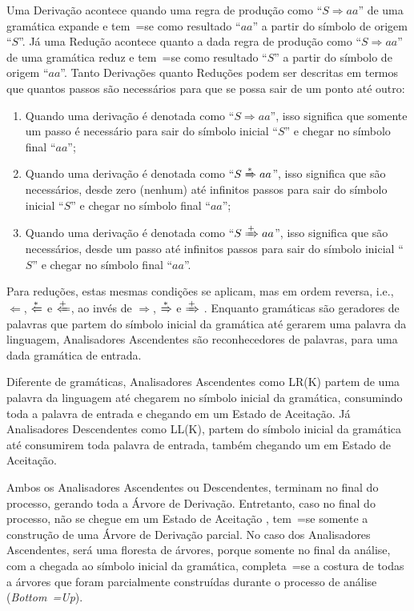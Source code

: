 Uma Derivação acontece quando uma regra de produção como ``$S \Rightarrow a a $'' de uma gramática expande e
tem~=se como resultado ``$a a$'' a partir do símbolo de origem ``$S$''.
Já uma Redução acontece quanto a dada regra de produção como ``$S \Rightarrow a a $'' de uma gramática reduz e
tem~=se como resultado ``$S$'' a partir do símbolo de origem ``$a a$''.
Tanto Derivações quanto Reduções podem ser descritas em termos que quantos passos são necessários para que se possa sair de um ponto até outro:
\begin{enumerate}%
    \item Quando uma derivação é denotada como ``$S \Rightarrow a a $'',
    isso significa que somente um passo é necessário para sair do símbolo inicial ``$S$'' e
    chegar no símbolo final ``$a a$'';
    \item Quando uma derivação é denotada como ``$S \xRightarrow{*} a a $'',
    isso significa que são necessários,
    desde zero (nenhum) até infinitos passos para sair do símbolo inicial ``$S$'' e
    chegar no símbolo final ``$a a$'';
    \item Quando uma derivação é denotada como ``$S \xRightarrow{+} a a $'',
    isso significa que são necessários,
    desde um passo até infinitos passos para sair do símbolo inicial ``$S$'' e
    chegar no símbolo final ``$a a$''.
\end{enumerate}

Para reduções,
estas mesmas condições se aplicam,
mas em ordem reversa,
i.e., $\Leftarrow$, $\xLeftarrow{*}$ e $\xLeftarrow{+}$,
ao invés de $\Rightarrow$,
$\xRightarrow{*}$ e
$\xRightarrow{+}$ \cite{ahoCompilerDragonBook}.
Enquanto gramáticas são geradores de palavras que partem do símbolo inicial da gramática até gerarem uma palavra da linguagem,
Analisadores Ascendentes são reconhecedores de palavras,
para uma dada gramática de entrada.

Diferente de gramáticas,
Analisadores Ascendentes como LR(K) partem de uma palavra da linguagem até chegarem no símbolo inicial da gramática,
consumindo toda a palavra de entrada e
chegando em um Estado de Aceitação.
Já Analisadores Descendentes como LL(K),
partem do símbolo inicial da gramática até consumirem toda palavra de entrada,
também chegando um em Estado de Aceitação.

Ambos os Analisadores Ascendentes ou
Descendentes,
terminam no final do processo,
gerando toda a Árvore de Derivação.
Entretanto,
caso no final do processo,
não se chegue em um Estado de Aceitação \cite{ahoCompilerDragonBook},
tem~=se somente a construção de uma Árvore de Derivação parcial.
No caso dos Analisadores Ascendentes,
será uma floresta de árvores,
porque somente no final da análise,
com a chegada ao símbolo inicial da gramática,
completa~=se a costura de todas a árvores que foram parcialmente construídas durante o processo de análise (\textit{Bottom~=Up}).

